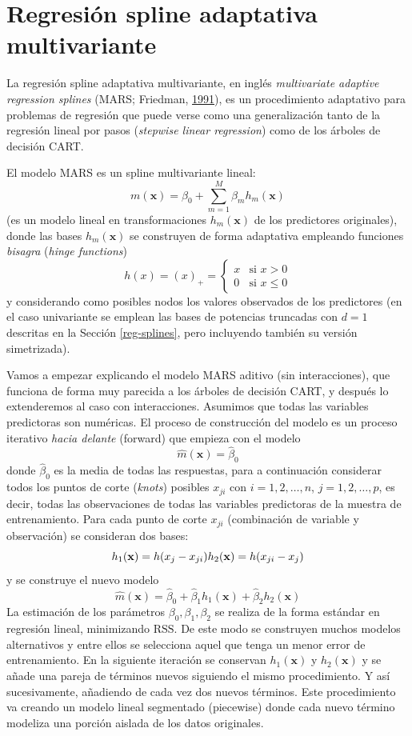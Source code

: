 \documentclass[
  spanish,
]{book}
\theoremstyle{break}
\theoremstyle{definition}
\theoremstyle{definition}
\theoremstyle{definition}
\theoremstyle{remark}
\begin{document}
\hypertarget{mars}{%
\section{Regresión spline adaptativa multivariante}\label{mars}}

La regresión spline adaptativa multivariante, en inglés \emph{multivariate adaptive regression splines} (MARS; Friedman, \protect\hyperlink{ref-friedman1991multivariate}{1991}), es un procedimiento adaptativo para problemas de regresión que puede verse como una generalización tanto de la regresión lineal por pasos (\emph{stepwise linear regression}) como de los árboles de decisión CART.

El modelo MARS es un spline multivariante lineal:\\
\[m(\mathbf{x}) = \beta_0 + \sum_{m=1}^M \beta_m h_m(\mathbf{x})\]
(es un modelo lineal en transformaciones \(h_m(\mathbf{x})\) de los predictores originales), donde las bases \(h_m(\mathbf{x})\) se construyen de forma adaptativa empleando funciones \emph{bisagra} (\emph{hinge functions})
\[ h(x) = (x)_+ = \left\{ \begin{array}{ll}
  x & \mbox{si } x > 0 \\
  0 & \mbox{si } x \leq 0
  \end{array}
  \right.\]
y considerando como posibles nodos los valores observados de los predictores
(en el caso univariante se emplean las bases de potencias truncadas con \(d=1\) descritas en la Sección \ref{reg-splines}, pero incluyendo también su versión simetrizada).

Vamos a empezar explicando el modelo MARS aditivo (sin interacciones), que funciona de forma muy parecida a los árboles de decisión CART, y después lo extenderemos al caso con interacciones.
Asumimos que todas las variables predictoras son numéricas. El proceso de construcción del modelo es un proceso iterativo \emph{hacia delante} (forward) que empieza con el modelo
\[\hat m(\mathbf{x}) = \hat \beta_0 \]
donde \(\hat \beta_0\) es la media de todas las respuestas, para a continuación considerar todos los puntos de corte (\emph{knots}) posibles \(x_{ji}\) con \(i = 1, 2, \ldots, n\), \(j = 1, 2, \ldots, p\), es decir, todas las observaciones de todas las variables predictoras de la muestra de entrenamiento.
Para cada punto de corte \(x_{ji}\) (combinación de variable y observación) se consideran dos bases:
\[h_1(\mathbf{x}) = h(x_j - x_{ji}) \\
h_2(\mathbf{x}) = h(x_{ji} - x_j)\]
y se construye el nuevo modelo
\[\hat m(\mathbf{x}) = \hat \beta_0 + \hat \beta_1 h_1(\mathbf{x}) + \hat \beta_2 h_2(\mathbf{x})\]
La estimación de los parámetros \(\beta_0, \beta_1, \beta_2\) se realiza de la forma estándar en regresión lineal, minimizando \(\mbox{RSS}\). De este modo se construyen muchos modelos alternativos y entre ellos se selecciona aquel que tenga un menor error de entrenamiento. En la siguiente iteración se conservan \(h_1(\mathbf{x})\) y \(h_2(\mathbf{x})\) y se añade una pareja de términos nuevos siguiendo el mismo procedimiento. Y así sucesivamente, añadiendo de cada vez dos nuevos términos. Este procedimiento va creando un modelo lineal segmentado (piecewise) donde cada nuevo término modeliza una porción aislada de los datos originales.
\end{document}
